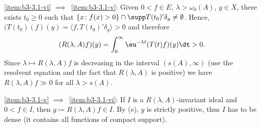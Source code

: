 \ref{item:b3-3.1-vi} $\implies$~\ref{item:b3-3.1-v}: Given $0 < f \in E$, $\lambda > \omega_{0}(A)$, $y \in X$, there exists $t_{0} \geq 0$ such that 
$\{x \colon f(x) > 0\} \cap \supp T(t_{0})'\delta_{y} \neq \emptyset$.
Hence, $(T(t_{0})(f)(y) = \langle f,T(t_{0})'\delta_{y} \rangle > 0$ and therefore
\[
(R(\lambda,A)f)(y) = \int_{0}^{\infty} \eu^{-\lambda t}(T(t)f)(y) \dt > 0 .
\]
Since $\lambda \mapsto R(\lambda,A)f$ is decreasing in the interval $(s(A),\infty)$ (use the resolvent equation and the fact that $R(\lambda,A)$ is positive) we have $R(\lambda,A)f \gg 0$ for all $\lambda > s(A)$.

\ref{item:b3-3.1-v} $\implies$~\ref{item:b3-3.1-vi}: If\/ $I$ is a $R(\lambda,A)$-invariant ideal and $0 < f \in I$, then $g \coloneqq R(\lambda,A)f \in I$. 
By (e), $g$ is strictly positive, thus $I$ has to be dense (it contains all functions of compact support). 

